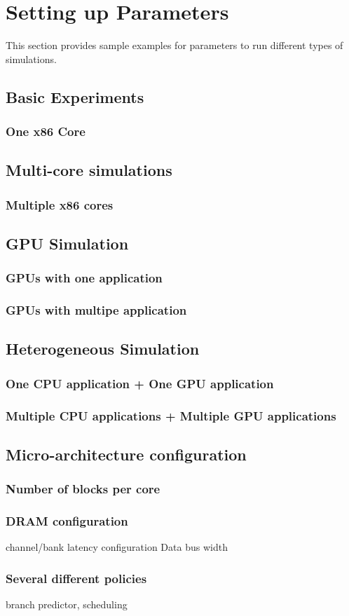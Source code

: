 
\clearpage
\section{Setting up Parameters}
\label{sec:parameter}
This section provides sample examples for parameters to run different types of simulations.

\subsection{Basic Experiments}
\subsubsection{One x86 Core}

\subsection{Multi-core simulations}
\subsubsection{Multiple x86 cores}

\subsection{GPU Simulation}
\subsubsection{GPUs with one application}
\subsubsection{GPUs with multipe application}


\subsection{Heterogeneous Simulation}
\subsubsection{One CPU application + One GPU application}
\subsubsection{Multiple CPU applications + Multiple GPU applications}

\subsection{Micro-architecture configuration}
\subsubsection{Number of blocks per core}
\subsubsection{DRAM configuration}
channel/bank latency configuration
Data bus width 

\subsubsection{Several different policies}
 branch predictor, scheduling 



